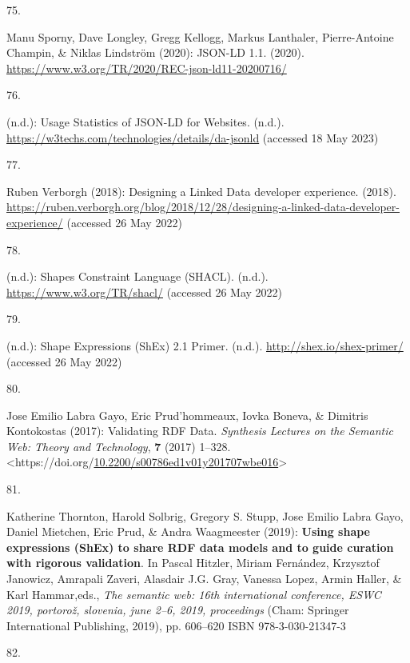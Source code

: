 \begin{thebibliography}{9}
\hypertarget{ref-w3-json-ld}{}
75.

Manu Sporny, Dave Longley, Gregg Kellogg, Markus Lanthaler,
Pierre-Antoine Champin, \& Niklas Lindström (2020): {JSON-LD} 1.1.
(2020). \url{https://www.w3.org/TR/2020/REC-json-ld11-20200716/}

\hypertarget{ref-UsageStatisticsJSONLD}{}
76.

(n.d.): {Usage Statistics of JSON-LD for Websites}. (n.d.).
\url{https://w3techs.com/technologies/details/da-jsonld} (accessed 18
May 2023)

\hypertarget{ref-DesigningLinkedData2018}{}
77.

Ruben Verborgh (2018): Designing a {Linked Data} developer experience.
(2018).
\url{https://ruben.verborgh.org/blog/2018/12/28/designing-a-linked-data-developer-experience/}
(accessed 26 May 2022)

\hypertarget{ref-w3-shacl}{}
78.

(n.d.): Shapes {Constraint Language} ({SHACL}). (n.d.).
\url{https://www.w3.org/TR/shacl/} (accessed 26 May 2022)

\hypertarget{ref-ShapeExpressionsShEx}{}
79.

(n.d.): Shape {Expressions} ({ShEx}) 2.1 {Primer}. (n.d.).
\url{http://shex.io/shex-primer/} (accessed 26 May 2022)

\hypertarget{ref-gayoValidatingRDFData2017a}{}
80.

Jose Emilio Labra Gayo, Eric Prud'hommeaux, Iovka Boneva, \& Dimitris
Kontokostas (2017): Validating {RDF Data}. \emph{Synthesis Lectures on
the Semantic Web: Theory and Technology}, \textbf{7} (2017) 1--328.
\textless https://doi.org/\href{https://doi.org/10.2200/s00786ed1v01y201707wbe016}{10.2200/s00786ed1v01y201707wbe016}\textgreater{}

\hypertarget{ref-thorntonUsingShapeExpressions2019a}{}
81.

Katherine Thornton, Harold Solbrig, Gregory S. Stupp, Jose Emilio Labra
Gayo, Daniel Mietchen, Eric Prud, \& Andra Waagmeester (2019):
\textbf{Using shape expressions ({ShEx}) to share {RDF} data models and
to guide curation with rigorous validation}. In Pascal Hitzler, Miriam
Fernández, Krzysztof Janowicz, Amrapali Zaveri, Alasdair J.G. Gray,
Vanessa Lopez, Armin Haller, \& Karl Hammar,eds., \emph{The semantic
web: 16th international conference, {ESWC} 2019, portorož, slovenia,
june 2--6, 2019, proceedings} ({Cham}: {Springer International
Publishing}, 2019), pp. 606--620 ISBN 978-3-030-21347-3

\hypertarget{ref-klimekSurveyToolsLinked2019a}{}
82.


\end{thebibliography}
